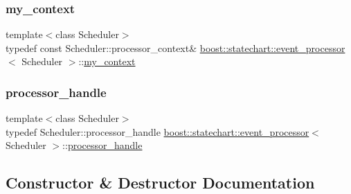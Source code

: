 \subsubsection{\texorpdfstring{my\+\_\+context}{my\_context}}
{\footnotesize\ttfamily template$<$class Scheduler$>$ \\
typedef const Scheduler\+::processor\+\_\+context\& \mbox{\hyperlink{classboost_1_1statechart_1_1event__processor}{boost\+::statechart\+::event\+\_\+processor}}$<$ Scheduler $>$\+::\mbox{\hyperlink{classboost_1_1statechart_1_1event__processor_a99f1c6ec8419ec82f140c5c93c5eb8cd}{my\+\_\+context}}\hspace{0.3cm}{\ttfamily [protected]}}

\mbox{\label{classboost_1_1statechart_1_1event__processor_a0cb7488f303c3c79a6bd52b58ce43a2a}} 
\subsubsection{\texorpdfstring{processor\+\_\+handle}{processor\_handle}}
{\footnotesize\ttfamily template$<$class Scheduler$>$ \\
typedef Scheduler\+::processor\+\_\+handle \mbox{\hyperlink{classboost_1_1statechart_1_1event__processor}{boost\+::statechart\+::event\+\_\+processor}}$<$ Scheduler $>$\+::\mbox{\hyperlink{classboost_1_1statechart_1_1event__processor_a0cb7488f303c3c79a6bd52b58ce43a2a}{processor\+\_\+handle}}}



\subsection{Constructor \& Destructor Documentation}
\mbox{\label{classboost_1_1statechart_1_1event__processor_abb48f7659323e4775763bf7ade2c07f8}} 
